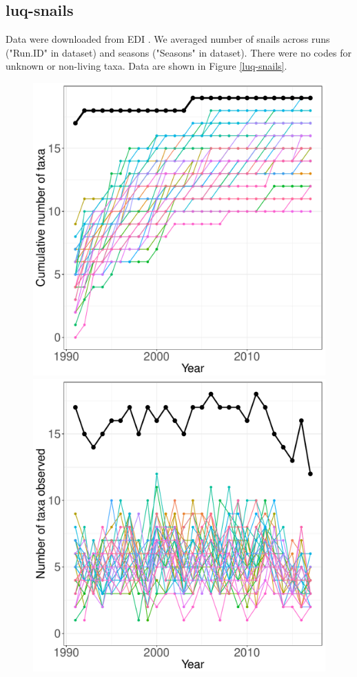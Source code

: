\documentclass[11pt, oneside]{article}
\begin{document}
\subsection{luq-snails}
Data were downloaded from EDI \citep{luq-snails}.
We averaged number of snails across runs ("Run.ID" in dataset) and seasons ("Seasons" in dataset). 
There were no codes for unknown or non-living taxa.
Data are shown in Figure \ref{luq-snails}.

\begin{figure}[h!]
\centering
\includegraphics[scale = 0.4]{luq-snails-compagnoni_species_accumulation_curve.pdf}
\includegraphics[scale = 0.4]{luq-snails-compagnoni_num_taxa_over_time.pdf}

\end{figure}
\end{document}
